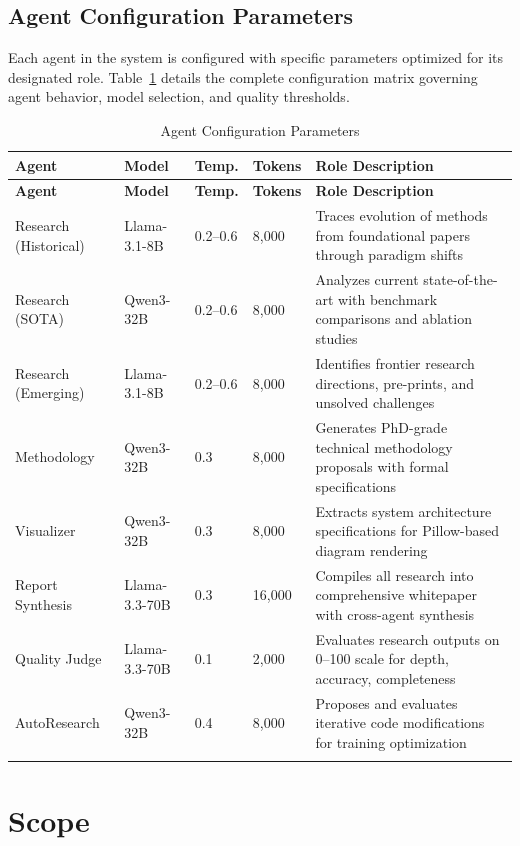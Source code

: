 \documentclass[a4paper,12pt,openany]{report}
\begin{document}
\subsection{Agent Configuration Parameters}

Each agent in the system is configured with specific parameters optimized for its designated role. Table~\ref{tab:agent_config} details the complete configuration matrix governing agent behavior, model selection, and quality thresholds.

\begin{longtable}{|p{2.5cm}|p{2.2cm}|p{1cm}|p{1.3cm}|p{6.5cm}|}
\hline
\textbf{Agent} & \textbf{Model} & \textbf{Temp.} & \textbf{Tokens} & \textbf{Role Description} \\
\hline
\endfirsthead
\hline
\textbf{Agent} & \textbf{Model} & \textbf{Temp.} & \textbf{Tokens} & \textbf{Role Description} \\
\hline
\endhead
\hline
\endfoot
Research (Historical) & Llama-3.1-8B & 0.2--0.6 & 8,000 & Traces evolution of methods from foundational papers through paradigm shifts \\
\hline
Research (SOTA) & Qwen3-32B & 0.2--0.6 & 8,000 & Analyzes current state-of-the-art with benchmark comparisons and ablation studies \\
\hline
Research (Emerging) & Llama-3.1-8B & 0.2--0.6 & 8,000 & Identifies frontier research directions, pre-prints, and unsolved challenges \\
\hline
Methodology & Qwen3-32B & 0.3 & 8,000 & Generates PhD-grade technical methodology proposals with formal specifications \\
\hline
Visualizer & Qwen3-32B & 0.3 & 8,000 & Extracts system architecture specifications for Pillow-based diagram rendering \\
\hline
Report Synthesis & Llama-3.3-70B & 0.3 & 16,000 & Compiles all research into comprehensive whitepaper with cross-agent synthesis \\
\hline
Quality Judge & Llama-3.3-70B & 0.1 & 2,000 & Evaluates research outputs on 0--100 scale for depth, accuracy, completeness \\
\hline
AutoResearch & Qwen3-32B & 0.4 & 8,000 & Proposes and evaluates iterative code modifications for training optimization \\
\hline
\caption{Agent Configuration Parameters}
\label{tab:agent_config}
\end{longtable}

\section{Scope}
\end{document}
